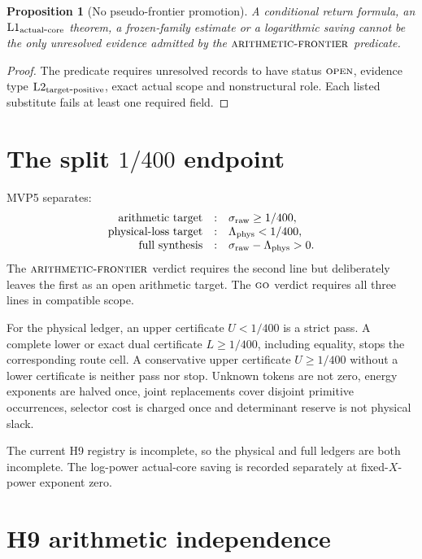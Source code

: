 \documentclass[11pt]{article}
\newtheorem{proposition}[theorem]{Proposition}
\theoremstyle{definition}
\theoremstyle{remark}
\newcommand{\Lone}{\mathrm{L1}}
\newcommand{\Ltwo}{\mathrm{L2}}
\newcommand{\GO}{\textnormal{\textsc{go}}}
\newcommand{\AF}{\textnormal{\textsc{arithmetic-frontier}}}
\newcommand{\OPEN}{\textnormal{\textsc{open}}}
\begin{document}
\begin{proposition}[No pseudo-frontier promotion]
A conditional return formula, an \(\Lone_{\rm actual\mbox{-}core}\)
theorem, a frozen-family estimate or a logarithmic saving cannot be
the only unresolved evidence admitted by the \(\AF\) predicate.
\end{proposition}

\begin{proof}
The predicate requires unresolved records to have status
\(\OPEN\), evidence type \(\Ltwo_{\rm target\mbox{-}positive}\), exact
actual scope and nonstructural role.  Each listed substitute fails at
least one required field.
\end{proof}

\section{The split \texorpdfstring{\(1/400\)}{1/400} endpoint}

MVP5 separates:
\[
\begin{array}{rcl}
\text{arithmetic target}&:&
 \sigma_{\rm raw}\ge1/400,\\
\text{physical-loss target}&:&
 \Lambda_{\rm phys}<1/400,\\
\text{full synthesis}&:&
 \sigma_{\rm raw}-\Lambda_{\rm phys}>0.
\end{array}
\]
The \(\AF\) verdict requires the second line but deliberately leaves
the first as an open arithmetic target.  The \(\GO\) verdict requires
all three lines in compatible scope.

For the physical ledger, an upper certificate
\(U<1/400\) is a strict pass.  A complete lower or exact dual
certificate \(L\ge1/400\), including equality, stops the corresponding
route cell.  A conservative upper certificate \(U\ge1/400\) without a
lower certificate is neither pass nor stop.  Unknown tokens are not
zero, energy exponents are halved once, joint replacements cover
disjoint primitive occurrences, selector cost is charged once and
determinant reserve is not physical slack.

The current H9 registry is incomplete, so the physical and full
ledgers are both incomplete.  The log-power actual-core saving is
recorded separately at fixed-\(X\)-power exponent zero.

\section{H9 arithmetic independence}
\end{document}
